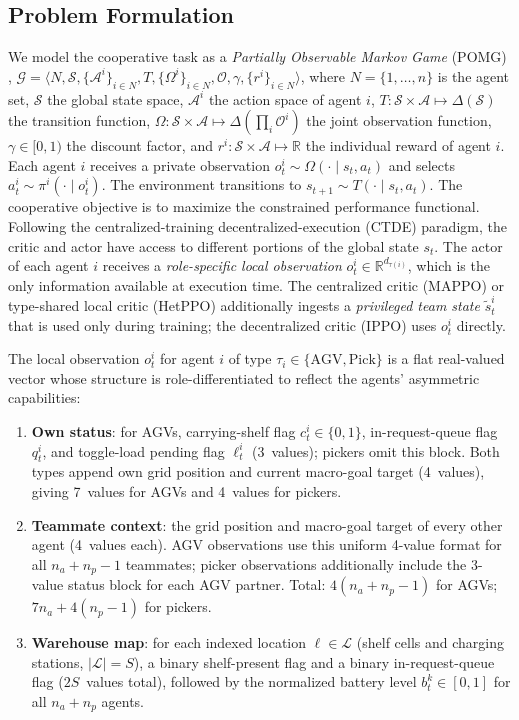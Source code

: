 \documentclass[Afour,sageh,times]{sagej}
\begin{document}
\subsection{Problem Formulation}
We model the cooperative task as a \emph{Partially Observable Markov Game} (POMG) \citep{oliehoek2016Concise}, $\mathcal{G} = \langle N, \mathcal{S}, \{\mathcal{A}^i\}_{i\in N}, T, \{\Omega^i\}_{i\in N}, \mathcal{O}, \gamma, \{r^i\}_{i\in N} \rangle$, where $N = \{1,\dots,n\}$ is the agent set, $\mathcal{S}$ the global state space, $\mathcal{A}^i$ the action space of agent $i$, $T: \mathcal{S} \times \mathcal{A} \mapsto \Delta(\mathcal{S})$ the transition function, $\Omega: \mathcal{S}\times\mathcal{A} \mapsto \Delta(\prod_i \mathcal{O}^i)$ the joint observation function, $\gamma \in [0,1)$ the discount factor, and $r^i: \mathcal{S}\times\mathcal{A}\mapsto\mathbb{R}$ the individual reward of agent $i$. Each agent $i$ receives a private observation $o_t^i \sim \Omega(\cdot \mid s_t, a_t)$ and selects $a_t^i \sim \pi^i(\cdot \mid o_t^i)$. The environment transitions to $s_{t+1} \sim T(\cdot \mid s_t, a_t)$. The cooperative objective is to maximize the constrained performance functional. Following the centralized-training decentralized-execution (CTDE) paradigm, the critic and actor have access to different portions of the global state $s_t$. The actor of each agent $i$ receives a \emph{role-specific local observation} $o_t^i \in \mathbb{R}^{d_{\tau(i)}}$, which is the only information available at execution time. The centralized critic (MAPPO) or type-shared local critic (HetPPO) additionally ingests a \emph{privileged team state} $\tilde{s}_t^i$ that is used only during training; the decentralized critic (IPPO) uses $o_t^i$ directly.

The local observation $o_t^i$ for agent $i$ of type $\tau_i \in \{\mathrm{AGV}, \mathrm{Pick}\}$ is a flat real-valued vector whose structure is role-differentiated to reflect the agents' asymmetric capabilities:

\begin{enumerate}
\item \textbf{Own status}: for AGVs, carrying-shelf flag $c_t^i \in \{0,1\}$, in-request-queue flag $q_t^i$, and toggle-load pending flag $\ell_t^i$ (3~values); pickers omit this block. Both types append own grid position and current macro-goal target (4~values), giving 7~values for AGVs and 4~values for pickers.
\item \textbf{Teammate context}: the grid position and macro-goal target of every other agent (4~values each). AGV observations use this uniform 4-value format for all $n_a+n_p-1$ teammates; picker observations additionally include the 3-value status block for each AGV partner. Total: $4(n_a+n_p-1)$ for AGVs; $7n_a+4(n_p-1)$ for pickers.
\item \textbf{Warehouse map}: for each indexed location $\ell \in \mathcal{L}$ (shelf cells and charging stations, $|\mathcal{L}|=S$), a binary shelf-present flag and a binary in-request-queue flag ($2S$~values total), followed by the normalized battery level $b_t^k \in [0,1]$ for all $n_a+n_p$ agents.
\end{enumerate}
\end{document}

